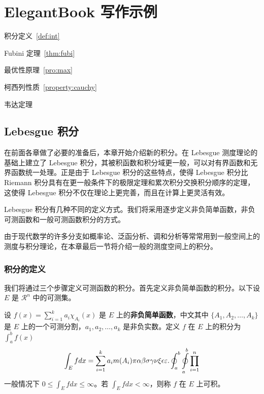 \documentclass[lang=cn,newtx,10pt,scheme=chinese]{elegantbook}
\begin{document}



\chapter{ElegantBook 写作示例}

\begin{introduction}
  \item 积分定义~\ref{def:int}
  \item Fubini 定理~\ref{thm:fubi}
  \item 最优性原理~\ref{pro:max}
  \item 柯西列性质~\ref{property:cauchy}
  \item 韦达定理
\end{introduction}

\section{Lebesgue 积分}
在前面各章做了必要的准备后，本章开始介绍新的积分。在 Lebesgue 测度理论的基础上建立了 Lebesgue 积分，其被积函数和积分域更一般，可以对有界函数和无界函数统一处理。正是由于 Lebesgue 积分的这些特点，使得 Lebesgue 积分比 Riemann 积分具有在更一般条件下的极限定理和累次积分交换积分顺序的定理，这使得 Lebesgue 积分不仅在理论上更完善，而且在计算上更灵活有效。

Lebesgue 积分有几种不同的定义方式。我们将采用逐步定义非负简单函数，非负可测函数和一般可测函数积分的方式。

由于现代数学的许多分支如概率论、泛函分析、调和分析等常常用到一般空间上的测度与积分理论，在本章最后一节将介绍一般的测度空间上的积分。

\subsection{积分的定义}

我们将通过三个步骤定义可测函数的积分。首先定义非负简单函数的积分。以下设 $E$ 是 $\mathcal{R}^n$ 中的可测集。

\begin{definition}[可积性] \label{def:int} 
设 $ f(x)=\sum\limits_{i=1}^{k} a_i \chi_{A_i}(x)$ 是 $E$ 上的\textbf{非负简单函数}，中文其中 $\{A_1,A_2,\ldots,A_k\}$ 是 $E$ 上的一个可测分割，$a_1,a_2,\ldots,a_k$ 是非负实数。定义 $f$ 在 $E$ 上的积分为 $\int_{a}^b f(x)$
\begin{equation}
   \label{inter}
   \int_{E} f dx = \sum_{i=1}^k a_i m(A_i) \pi \alpha\beta\sigma\gamma\nu\xi\epsilon\varepsilon. \oint_{a}^b\ointop_{a}^b\prod_{i=1}^n
\end{equation}
一般情况下 $0 \leq \int_{E} f dx \leq \infty$。若 $\int_{E} f dx < \infty$，则称 $f$ 在 $E$ 上可积。
\end{definition}
\end{document}

